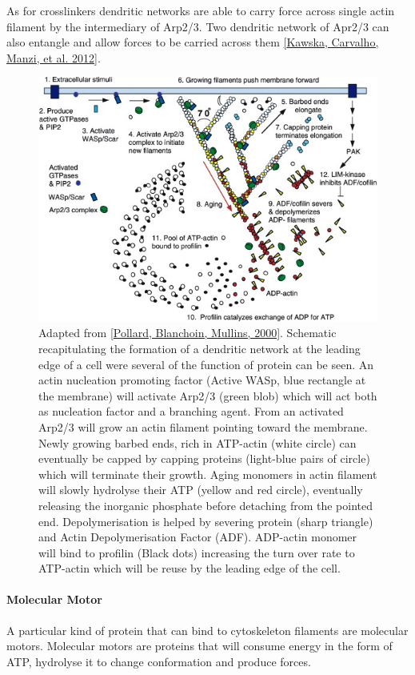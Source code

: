 \documentclass[A4paperpaper,11pt,english]{sphinxmanual}
\begin{document}
As for crosslinkers dendritic networks are able to carry force across single
actin filament by the intermediary of Arp2/3. Two dendritic network of Apr2/3
can also entangle and allow forces to be carried across them
{\hyperref[parts/part1:kawska2012]{{[}Kawska, Carvalho, Manzi,  et al.  2012{]}}}.
\begin{figure}[htbp]
\centering
\capstart

\includegraphics[width=0.700\linewidth]{pollard2003-actin-cycle.jpg}
\caption{Adapted from {\hyperref[parts/part1:pollard2000]{{[}Pollard, Blanchoin, Mullins,  2000{]}}}. Schematic recapitulating the formation of
a dendritic network at the leading edge of a cell were several of the
function of protein can be seen. An actin nucleation promoting factor
(Active WASp,  blue rectangle at the membrane) will activate Arp2/3 (green
blob) which will act both as nucleation factor and a branching agent. From
an activated Arp2/3 will grow an actin filament pointing toward the
membrane. Newly growing barbed ends, rich in ATP-actin (white circle) can
eventually be capped by capping proteins (light-blue pairs of circle) which
will terminate their growth.  Aging monomers in actin filament will slowly
hydrolyse their ATP (yellow and red circle), eventually releasing the
inorganic phosphate before detaching from the pointed end.
Depolymerisation is helped by severing protein (sharp triangle) and Actin
Depolymerisation Factor (ADF). ADP-actin monomer will bind to profilin
(Black dots) increasing the turn over rate to ATP-actin which will be reuse
by the leading edge of the cell.}\label{parts/part1:actin-cycle}\end{figure}


\paragraph{Molecular Motor}
\label{parts/part1:molecular-motor}
A particular kind of protein that can bind to cytoskeleton filaments are
molecular motors. Molecular motors are proteins that will consume energy
in the form of ATP, hydrolyse it to change conformation and produce forces.
\end{document}
